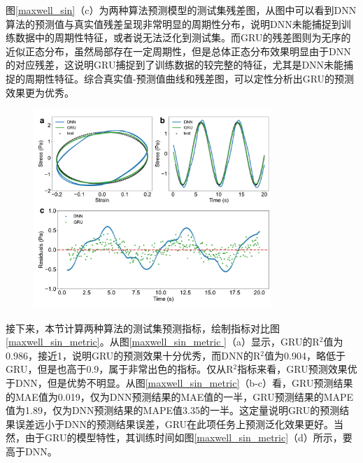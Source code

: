 图\ref{maxwell_sin}（c）为两种算法预测模型的测试集残差图，从图中可以看到DNN算法的预测值与真实值残差呈现非常明显的周期性分布，说明DNN未能捕捉到训练数据中的周期性特征，或者说无法泛化到测试集。而GRU的残差图则为无序的近似正态分布，虽然局部存在一定周期性，但是总体正态分布效果明显由于DNN的对应残差，这说明GRU捕捉到了训练数据的较完整的特征，尤其是DNN未能捕捉的周期性特征。综合真实值-预测值曲线和残差图，可以定性分析出GRU的预测效果更为优秀。
\begin{figure}[htbp]
  \centering
  \includegraphics[width=0.8\textwidth]{Fig/Maxwell_sin_.pdf}
\end{figure}
接下来，本节计算两种算法的测试集预测指标，绘制指标对比图\ref{maxwell_sin_metric}。从图\ref{maxwell_sin_metric
}（a）显示，GRU的R$^2$值为0.986，接近1，说明GRU的预测效果十分优秀，而DNN的R$^2$值为0.904，略低于GRU，但是也高于0.9，属于非常出色的指标。仅从R$^2$指标来看，GRU预测效果优于DNN，但是优势不明显。从图\ref{maxwell_sin_metric}（b-c）看，GRU预测结果的MAE值为0.019，仅为DNN预测结果的MAE值的一半，GRU预测结果的MAPE值为1.89，仅为DNN预测结果的MAPE值3.35的一半。这定量说明GRU的预测结果误差远小于DNN的预测结果误差，GRU在此项任务上预测泛化效果更好。当然，由于GRU的模型特性，其训练时间如图\ref{maxwell_sin_metric}（d）所示，要高于DNN。
